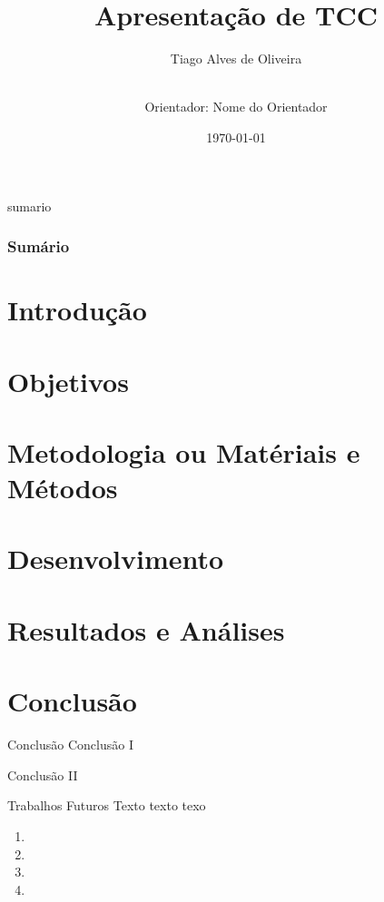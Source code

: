 \documentclass[compress]{beamer}
\title{Apresentação de TCC}
\institute{Curso de Engenharia da Computação - UEMG - Unidade Divinópolis}
\author{Tiago Alves de Oliveira \and \\
Orientador: Nome do Orientador}
\date{\today}
\begin{document}
\maketitle


\begin{frame}{sumario}
    \frametitle{Sumário}
    \tableofcontents
\end{frame}

\section{Introdução}

\section{Objetivos}

\section{Metodologia ou Matériais e Métodos}

\section{Desenvolvimento}

\section{Resultados e Análises}

\section{Conclusão}

\begin{frame}[label=conclusao]{Conclusão}
    Conclusão I
    
    Conclusão II
\end{frame}

\begin{frame}[label=trabalhosfuturos]{Trabalhos Futuros}
    Texto texto texo
    \begin{enumerate}
        \item<+-> {} 
        \item<+-> {}
        \item<+-> {}
        \item<+-> {}
    \end{enumerate}
\end{frame}
\end{document}
